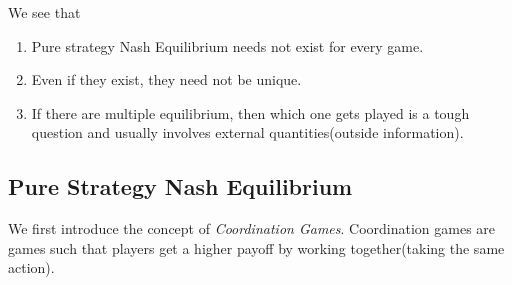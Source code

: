 \begin{remark}
	We see that
	\begin{enumerate}
		\item Pure strategy Nash Equilibrium needs not exist for every game.
		\item Even if they exist, they need not be unique.
		\item If there are multiple equilibrium, then which one gets played is a tough question and usually involves external quantities(outside information).
	\end{enumerate}
\end{remark}

\subsection{Pure Strategy Nash Equilibrium}
We first introduce the concept of \emph{Coordination Games}. Coordination games are games such that players get a higher payoff by working together(taking the same action).

